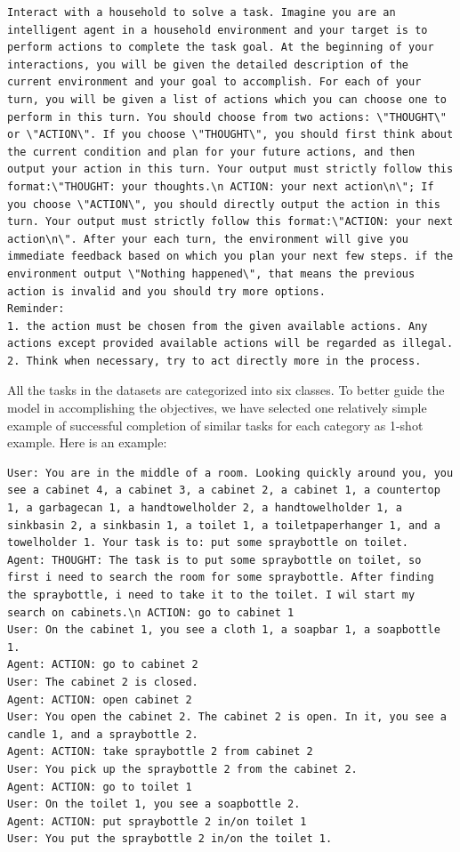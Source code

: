 \begin{lstlisting}
Interact with a household to solve a task. Imagine you are an intelligent agent in a household environment and your target is to perform actions to complete the task goal. At the beginning of your interactions, you will be given the detailed description of the current environment and your goal to accomplish. For each of your turn, you will be given a list of actions which you can choose one to perform in this turn. You should choose from two actions: \"THOUGHT\" or \"ACTION\". If you choose \"THOUGHT\", you should first think about the current condition and plan for your future actions, and then output your action in this turn. Your output must strictly follow this format:\"THOUGHT: your thoughts.\n ACTION: your next action\n\"; If you choose \"ACTION\", you should directly output the action in this turn. Your output must strictly follow this format:\"ACTION: your next action\n\". After your each turn, the environment will give you immediate feedback based on which you plan your next few steps. if the environment output \"Nothing happened\", that means the previous action is invalid and you should try more options.
Reminder: 
1. the action must be chosen from the given available actions. Any actions except provided available actions will be regarded as illegal.
2. Think when necessary, try to act directly more in the process.
\end{lstlisting}

All the tasks in the datasets are categorized into six classes. To better guide the model in accomplishing the objectives, we have selected one relatively simple example of successful completion of similar tasks for each category as 1-shot example. Here is an example:

\begin{lstlisting}
User: You are in the middle of a room. Looking quickly around you, you see a cabinet 4, a cabinet 3, a cabinet 2, a cabinet 1, a countertop 1, a garbagecan 1, a handtowelholder 2, a handtowelholder 1, a sinkbasin 2, a sinkbasin 1, a toilet 1, a toiletpaperhanger 1, and a towelholder 1. Your task is to: put some spraybottle on toilet.
Agent: THOUGHT: The task is to put some spraybottle on toilet, so first i need to search the room for some spraybottle. After finding the spraybottle, i need to take it to the toilet. I wil start my search on cabinets.\n ACTION: go to cabinet 1
User: On the cabinet 1, you see a cloth 1, a soapbar 1, a soapbottle 1.
Agent: ACTION: go to cabinet 2
User: The cabinet 2 is closed.
Agent: ACTION: open cabinet 2
User: You open the cabinet 2. The cabinet 2 is open. In it, you see a candle 1, and a spraybottle 2.
Agent: ACTION: take spraybottle 2 from cabinet 2
User: You pick up the spraybottle 2 from the cabinet 2.
Agent: ACTION: go to toilet 1
User: On the toilet 1, you see a soapbottle 2.
Agent: ACTION: put spraybottle 2 in/on toilet 1
User: You put the spraybottle 2 in/on the toilet 1.

\end{lstlisting}